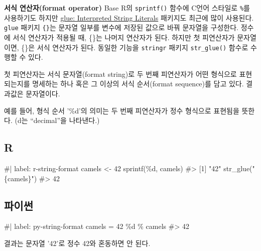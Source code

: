 \documentclass[
  letterpaper,
]{book}
\newenvironment{Shaded}{\begin{snugshade}}{\end{snugshade}}
\newcommand{\NormalTok}[1]{\textcolor[rgb]{0.00,0.23,0.31}{#1}}
\begin{document}
 

\textbf{서식 연산자(format operator)} Base R의 \texttt{sprintf()} 함수에
C언어 스타일로 \texttt{\%}를 사용하기도 하지만
\href{https://cran.r-project.org/web/packages/glue/index.html}{glue:
Interpreted String Literals} 패키지도 최근에 많이 사용된다.
\texttt{glue} 패키지 \texttt{\{\}}는 문자열 일부를 변수에 저장된 값으로
바꿔 문자열을 구성한다. 정수에 서식 연산자가 적용될 때, \{\}는 나머지
연산자가 된다. 하지만 첫 피연산자가 문자열이면, \{\}은 서식 연산자가
된다. 동일한 기능을 \texttt{stringr} 패키지 \texttt{str\_glue()} 함수로
수행할 수 있다. 

첫 피연산자는 서식 문자열(format string)로 두 번째 피연산자가 어떤
형식으로 표현되는지를 명세하는 하나 혹은 그 이상의 서식 순서(format
sequence)를 담고 있다. 결과값은 문자열이다. 

예를 들어, 형식 순서 '\%d'의 의미는 두 번째 피연산자가 정수 형식으로
표현됨을 뜻한다. (d는 ``decimal''을 나타낸다.)

\subsection{R}

\begin{Shaded}
\begin{Highlighting}[]
\NormalTok{\#| label: r{-}string{-}format}
\NormalTok{camels \textless{}{-} 42}
\NormalTok{sprintf(\textquotesingle{}\%d\textquotesingle{}, camels)}
\NormalTok{\#\textgreater{} [1] "42"}
\NormalTok{str\_glue("\{camels\}")}
\NormalTok{\#\textgreater{} 42}
\end{Highlighting}
\end{Shaded}

\subsection{파이썬}

\begin{Shaded}
\begin{Highlighting}[]
\NormalTok{\#| label: py{-}string{-}format}
\NormalTok{camels = 42}
\NormalTok{\textquotesingle{}\%d\textquotesingle{} \% camels}
\NormalTok{\#\textgreater{} \textquotesingle{}42\textquotesingle{}}
\end{Highlighting}
\end{Shaded}

결과는 문자열 '42'로 정수 42와 혼동하면 안 된다.
\end{document}
